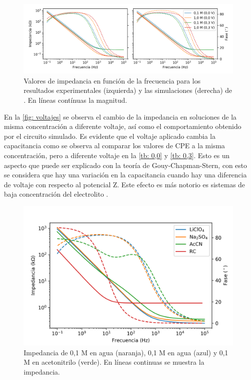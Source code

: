 \documentclass[fleqn,11pt]{SelfArx}
\begin{document}
	\begin{figure}[h]
		\centering
		\includegraphics[width = \linewidth]{simulaciones}
		\caption{Valores de impedancia en funci\'on de la frecuencia para los resultados experimentales (izquierda) y las simulaciones (derecha) de . En l\'ineas cont\'inuas la magnitud.}
		\label{fig: voltajes}
	\end{figure}
	
	En la \autoref{fig: voltajes} se observa el cambio de la impedancia en soluciones de la misma concentración a diferente voltaje, as\'i como el comportamiento obtenido por el circuito simulado. Es evidente que el voltaje aplicado cambia la capacitancia como se observa al comparar los valores de CPE a la misma concentración, pero a diferente voltaje en la \autoref{tb: 0,0} y \autoref{tb: 0,3}. Esto es un aspecto que puede ser explicado con la teoría de Gouy-Chapman-Stern, con esto se considera que hay una variación en la capacitancia cuando hay una diferencia de voltaje con respecto al potencial Z. Este efecto es más notorio es sistemas de baja concentración del electrolito \cite{bard2001fundamentals}.
	
	\begin{figure}[h]
		\centering
		\includegraphics[width = \linewidth]{Iones}
		\caption{Impedancia de  0,1 M en agua (naranja),  0,1 M en agua (azul) y 0,1 M en acetonitrilo (verde). En l\'ineas continuas se muestra la impedancia.}
		\label{fig: iones}
	\end{figure}
	
\end{document}
